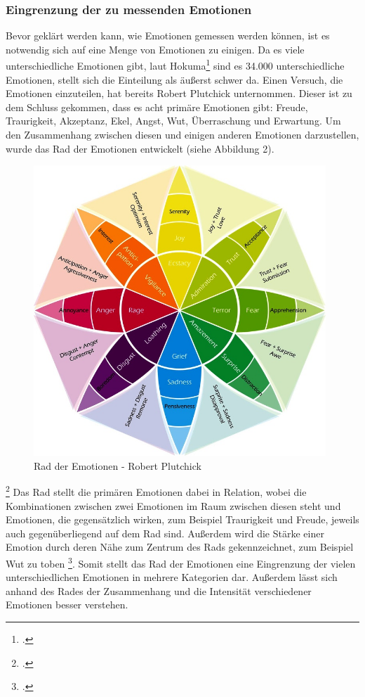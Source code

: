 \subsubsection{Eingrenzung der zu messenden Emotionen}
Bevor geklärt werden kann, wie Emotionen gemessen werden können, ist es notwendig sich auf eine Menge von Emotionen zu einigen. Da es viele unterschiedliche Emotionen gibt, laut Hokuma\footcite[Vgl.][Absch. 1]{Hok17} sind es 34.000 unterschiedliche Emotionen, stellt sich die Einteilung als äußerst schwer da. Einen Versuch, die Emotionen einzuteilen, hat bereits Robert Plutchick unternommen. Dieser ist zu dem Schluss gekommen, dass es acht primäre Emotionen gibt: Freude, Traurigkeit, Akzeptanz, Ekel, Angst, Wut, Überraschung und Erwartung. Um den Zusammenhang zwischen diesen und einigen anderen Emotionen darzustellen, wurde das Rad der Emotionen entwickelt (siehe Abbildung 2).\newline
\begin{figure}[h]
	\centering
	\includegraphics[width=11cm]{Bilder/wheel-of-emotions.png}
	\caption[Rad der Emotionen - Robert Plutchick]{Rad der Emotionen - Robert Plutchick\footnotemark}
\end{figure}%
\footcitetext[Vgl.][]{Hok17}
\newline
Das Rad stellt die primären Emotionen dabei in Relation, wobei die Kombinationen zwischen zwei Emotionen im Raum zwischen diesen steht und Emotionen, die gegensätzlich wirken, zum Beispiel Traurigkeit und Freude, jeweils auch gegenüberliegend auf dem Rad sind. Außerdem wird die Stärke einer Emotion durch deren Nähe zum Zentrum des Rads gekennzeichnet, zum Beispiel Wut zu toben \footcite[Vgl.][Absch. Elements of the Wheel]{Hok17}.\newline
Somit stellt das Rad der Emotionen eine Eingrenzung der vielen unterschiedlichen Emotionen in mehrere Kategorien dar. Außerdem lässt sich anhand des Rades der Zusammenhang und die Intensität verschiedener Emotionen besser verstehen. 
